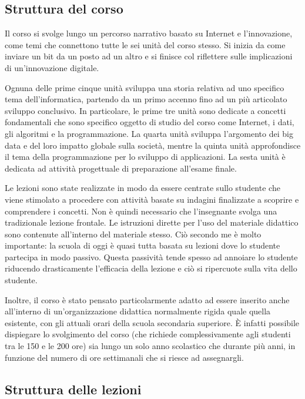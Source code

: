 \documentclass[11pt,a4paper]{article}
\begin{document}
\subsection{Struttura del corso}

Il corso si svolge lungo un percorso narrativo basato su Internet e
l'innovazione, come temi che connettono tutte le sei unità del corso
stesso. Si inizia da come inviare un bit da un posto ad un altro e si
finisce col riflettere sulle implicazioni di un'innovazione digitale.

Ognuna delle prime cinque unità sviluppa una storia relativa ad
uno specifico tema dell'informatica, partendo da un primo accenno fino
ad un più articolato sviluppo conclusivo. In particolare, le prime tre
unità sono dedicate a concetti fondamentali che sono specifico oggetto
di studio del corso come Internet, i dati, gli algoritmi e la
programmazione. La quarta unità sviluppa l'argomento dei big data e
del loro impatto globale sulla società, mentre la quinta unità
approfondisce il tema della programmazione per lo sviluppo di
applicazioni. La sesta unità è dedicata ad attività progettuale di
preparazione all'esame finale.

Le lezioni sono state realizzate in modo da essere centrate sullo
studente che viene stimolato a procedere con attività basate su
indagini finalizzate a scoprire e comprendere i concetti. Non è quindi
necessario che l'insegnante svolga una tradizionale lezione frontale.
Le istruzioni dirette per l'uso del materiale
didattico sono contenute all'interno del materiale stesso. Ciò secondo
me è molto importante: la scuola di oggi è quasi tutta basata su
lezioni dove lo studente partecipa in modo passivo. Questa passività
tende spesso ad annoiare lo studente riducendo drasticamente
l'efficacia della lezione e ciò si ripercuote sulla vita dello
studente.

Inoltre, il corso è stato pensato particolarmente adatto ad
essere inserito anche all'interno di un'organizzazione didattica
normalmente rigida quale quella esistente, con gli attuali orari della
scuola secondaria superiore. È infatti possibile dispiegare lo
svolgimento del corso (che richiede complessivamente agli studenti tra
le 150 e le 200 ore) sia lungo un solo anno scolastico che durante più
anni, in funzione del numero di ore settimanali che si riesce ad
assegnargli.

\subsection{Struttura delle lezioni}
\end{document}
